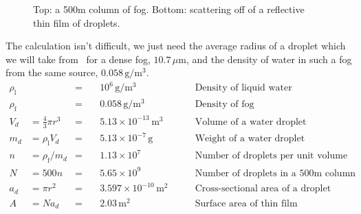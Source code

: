 \begin{figure}[h]
  \par\vspace{\baselineskip}
  \caption{Top: a 500m column of fog. Bottom: scattering off of a
    reflective thin film of droplets.}
  \label{fig:column-fog}
\end{figure}
The calculation isn't difficult, we just need the average radius of a
droplet which we will take from~\cite{hess_optical_1998} for a dense
fog, $10.7\,\mu\text{m}$, and the density of water in such a fog from
the same source, $0.058\,\text{g}/\text{m}^3$. 
\begin{align}
  \rho_{\text{l}} &&=&\quad 10^6\,\text{g}/\text{m}^3 
  &\qquad\text{Density of liquid water}\\
  \rho_{\text{f}} &&=&\quad 0.058\,\text{g}/\text{m}^3
  &\qquad\text{Density of fog}\\
  V_d &= \frac{4}{3}\pi r^3 &=&\quad 5.13\times 10^{-13}\,\text{m}^3
  &\qquad\text{Volume of a water droplet}\\ 
  m_d &= \rho_{\text{l}} V_d &=&\quad 5.13\times 10^{-7}\,\text{g}
  &\qquad\text{Weight of a water droplet}\\
  n &= \rho_{\text{f}}/m_d &=&\quad 1.13\times 10^{7}
  &\qquad\text{Number of droplets per unit volume}\\
  N &= 500n &=&\quad 5.65\times 10^{9}
  &\qquad\text{Number of droplets in a 500m column}\\
  a_d &= \pi r^2 &=&\quad 3.597\times 10^{-10}\,\text{m}^2
  &\qquad \text{Cross-sectional area of a droplet}\\
  A &= Na_d &=&\quad 2.03\,\text{m}^2
  &\qquad \text{Surface area of thin film}
\end{align}


